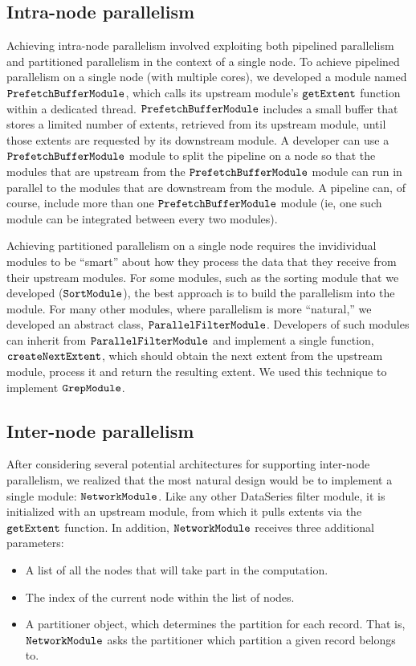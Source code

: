 \documentclass[ 11pt, letterpaper]{article}%
\begin{document}
\subsection{Intra-node parallelism}

Achieving intra-node parallelism involved exploiting both pipelined parallelism
and partitioned parallelism in the context of a single node. To achieve
pipelined parallelism on a single node (with multiple cores), we developed a
module named $\tt PrefetchBufferModule$, which calls its upstream module's $\tt
getExtent$ function within a dedicated thread. $\tt PrefetchBufferModule$
includes a small buffer that stores a limited number of extents, retrieved from its upstream module, until those extents are requested by its downstream
module. A developer can use a $\tt
PrefetchBufferModule$ module to split the pipeline on a node so that the
modules that are upstream from the $\tt
PrefetchBufferModule$ module can run in parallel to the modules that are
downstream from the module. A pipeline can, of course, include more than one
$\tt PrefetchBufferModule$ module (ie, one such module can be integrated
between every two modules).

Achieving partitioned parallelism on a single node requires the invidividual
modules to be ``smart'' about how they process the data that they receive from
their upstream modules. For some modules, such as the sorting module that we
developed ($\tt SortModule$), the best approach is to build the
parallelism into the module. For many other modules, where parallelism is more
``natural,'' we developed an abstract class, $\tt ParallelFilterModule$.
Developers of such modules can inherit from $\tt ParallelFilterModule$ and
implement a single function, $\tt createNextExtent$, which should obtain the
next extent from the upstream module, process it and return the resulting
extent. We used this technique to implement $\tt GrepModule$.

\subsection{Inter-node parallelism}

After considering several potential architectures for supporting inter-node
parallelism, we realized that the most natural design would be to implement a
single module: $\tt NetworkModule$. Like any other DataSeries filter module, it is initialized with an upstream module, from which
it pulls extents via the $\tt getExtent$ function. In addition, $\tt
NetworkModule$ receives three additional parameters:
\begin{itemize}
  \item A list of all the nodes that will take part in the computation.
  \item The index of the current node within the list of nodes.
  \item A partitioner object, which determines the partition for each
  record. That is, $\tt NetworkModule$ asks the partitioner which partition a
  given record belongs to.
\end{itemize}
\end{document}

